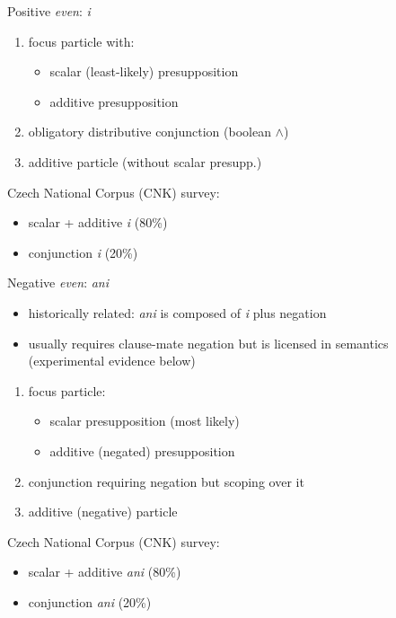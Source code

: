 \documentclass[ignorenonframetext,]{beamer}
\providecommand{\tightlist}{%
  \setlength{\itemsep}{0pt}\setlength{\parskip}{0pt}}
\begin{document}
\begin{frame}{Positive \emph{even}: \emph{i}}

\begin{enumerate}
\def\labelenumi{\arabic{enumi})}
\tightlist
\item
  focus particle with:

    \begin{itemize}
    \tightlist
    \item
      scalar (least-likely) presupposition
    \item
      additive presupposition
    \end{itemize}

\item
  obligatory distributive conjunction (boolean \(\wedge\))
\item
  additive particle (without scalar presupp.)
\end{enumerate}

Czech National Corpus (CNK) survey: 

\begin{itemize}
\tightlist
\item
  scalar + additive \emph{i} (80\%)
\item  conjunction \emph{i} (20\%)
\end{itemize}

\end{frame}

\begin{frame}{Negative \emph{even}: \emph{ani}}

\begin{itemize}
\tightlist
\item
  historically related: \emph{ani} is composed of \emph{i} plus negation
\item
  usually requires clause-mate negation but is licensed in semantics
  (experimental evidence below)
\end{itemize}

\begin{enumerate}
\def\labelenumi{\arabic{enumi})}
\tightlist
\item
  focus particle:

    \begin{itemize}
    \tightlist
    \item
      scalar presupposition (most likely)
    \item
      additive (negated) presupposition
    \end{itemize}
    \item
  conjunction requiring negation but scoping over it
   \item
    additive (negative) particle
\end{enumerate}

Czech National Corpus (CNK) survey: 

\begin{itemize}
    \tightlist
\item
  scalar + additive \emph{ani} (80\%)
\item
  conjunction \emph{ani} (20\%)
\end{itemize}

\end{frame}
\end{document}
